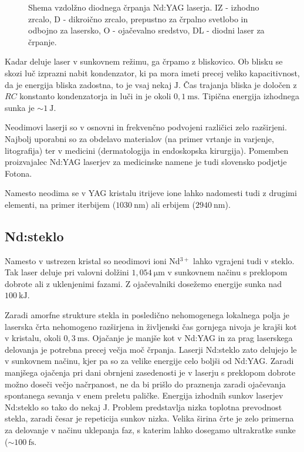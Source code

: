 \begin{figure}[h]
\centering
\def\svgwidth{90truemm} 

\caption{Shema vzdolžno diodnega črpanja Nd:YAG laserja. IZ - izhodno zrcalo, D - dikroično zrcalo, 
prepustno za črpalno svetlobo in odbojno za lasersko, O - ojačevalno sredstvo, DL - diodni 
laser za črpanje.
}
\label{fig:NdS2}
\end{figure}

Kadar deluje laser v sunkovnem režimu, ga črpamo z bliskovico. Ob blisku
se skozi luč izprazni nabit kondenzator, ki pa mora imeti precej veliko kapacitivnost, 
da je energija bliska zadostna, to je vsaj nekaj $\si{\joule}$. 
Čas trajanja bliska je določen z $RC$ konstanto kondenzatorja in luči in je okoli 
$0,1~\si{\milli\second}$. Tipična energija izhodnega sunka je $\sim 1~\si{\joule}$.

Neodimovi laserji so v osnovni in frekvenčno podvojeni različici zelo razširjeni. 
Najbolj uporabni so za obdelavo materialov (na primer vrtanje in varjenje, 
litografija) ter v medicini (dermatologija in endoskopska kirurgija). 
Pomemben proizvajalec Nd:YAG laserjev 
za medicinske namene je tudi slovensko podjetje Fotona. 

\begin{remark}
Namesto neodima se v YAG kristalu itrijeve ione lahko nadomesti tudi z drugimi
elementi, na primer iterbijem ($1030~\si{\nano\metre}$) ali erbijem
($2940~\si{\nano\metre}$).
\end{remark}

\subsection{Nd:steklo}
Namesto v ustrezen kristal so neodimovi ioni Nd$^{3+}$ lahko vgrajeni tudi v steklo. 
Tak laser deluje pri valovni dolžini $1,054~\si{\micro\meter}$ v sunkovnem načinu 
s preklopom dobrote ali z uklenjenimi fazami. Z ojačevalniki dosežemo energije 
sunka nad $100~\si{\kilo\joule}$. 

Zaradi amorfne strukture stekla in posledično 
nehomogenega lokalnega polja je laserska črta nehomogeno razširjena in
življenski čas gornjega nivoja je krajši kot v kristalu, okoli $0,3~\si{\milli\second}$.
Ojačanje je manjše kot v Nd:YAG in za prag laserskega delovanja je
potrebna precej večja moč črpanja. Laserji Nd:steklo zato delujejo le v sunkovnem
načinu, kjer pa so za velike energije celo boljši od Nd:YAG. Zaradi
manjšega ojačenja pri dani obrnjeni zasedenosti je v laserju s preklopom
dobrote možno doseči večjo načrpanost, ne da bi prišlo do praznenja
zaradi ojačevanja spontanega sevanja v enem preletu paličke. Energija
izhodnih sunkov laserjev Nd:steklo so tako do nekaj J. Problem predstavlja 
nizka toplotna prevodnost stekla, zaradi česar je repeticija sunkov nizka.
Velika širina črte je zelo primerna za delovanje v načinu uklepanja faz, s 
katerim lahko dosegamo ultrakratke sunke ($\sim 100~\si{\femto\second}$. 


